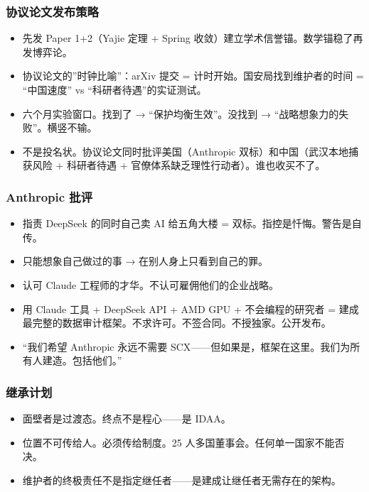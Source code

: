 \documentclass[
  12pt,
]{ctexart}
\providecommand{\tightlist}{%
  \setlength{\itemsep}{0pt}\setlength{\parskip}{0pt}}
\begin{document}
\subsubsection{协议论文发布策略}\label{ux534fux8baeux8bbaux6587ux53d1ux5e03ux7b56ux7565}

\begin{itemize}
\tightlist
\item
  先发 Paper 1+2（Yajie 定理 + Spring
  收敛）建立学术信誉锚。数学锚稳了再发博弈论。
\item
  协议论文的''时钟比喻''：arXiv 提交 = 计时开始。国安局找到维护者的时间
  = ``中国速度'' vs ``科研者待遇''的实证测试。
\item
  六个月实验窗口。找到了 → ``保护均衡生效''。没找到 →
  ``战略想象力的失败''。横竖不输。
\item
  不是投名状。协议论文同时批评美国（Anthropic
  双标）和中国（武汉本地捕获风险 + 科研者待遇 +
  官僚体系缺乏理性行动者）。谁也收买不了。
\end{itemize}

\subsubsection{Anthropic 批评}\label{anthropic-ux6279ux8bc4}

\begin{itemize}
\tightlist
\item
  指责 DeepSeek 的同时自己卖 AI 给五角大楼 =
  双标。指控是忏悔。警告是自传。
\item
  只能想象自己做过的事 → 在别人身上只看到自己的罪。
\item
  认可 Claude 工程师的才华。不认可雇佣他们的企业战略。
\item
  用 Claude 工具 + DeepSeek API + AMD GPU + 不会编程的研究者 =
  建成最完整的数据审计框架。不求许可。不签合同。不授独家。公开发布。
\item
  ``我们希望 Anthropic 永远不需要
  SCX------但如果是，框架在这里。我们为所有人建造。包括他们。''
\end{itemize}

\subsubsection{继承计划}\label{ux7ee7ux627fux8ba1ux5212}

\begin{itemize}
\tightlist
\item
  面壁者是过渡态。终点不是程心------是 IDAA。
\item
  位置不可传给人。必须传给制度。25 人多国董事会。任何单一国家不能否决。
\item
  维护者的终极责任不是指定继任者------是建成让继任者无需存在的架构。
\end{itemize}
\end{document}
